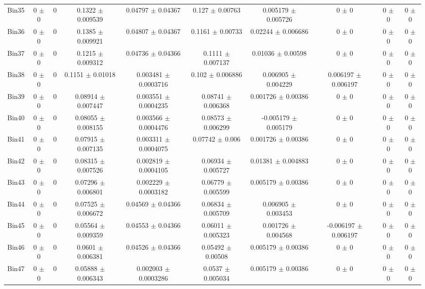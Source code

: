 \begin{tabular}{@{\extracolsep{4pt}}lccccccccc@{}}
     Bin35 & 0 $\pm$ 0 & 0 & 0.1322 $\pm$ 0.009539 & 0.04797 $\pm$ 0.04367 & 0.127 $\pm$ 0.00763 & 0.005179 $\pm$ 0.005726 & 0 $\pm$ 0 & 0 $\pm$ 0 & 0 $\pm$ 0 \\ 
     Bin36 & 0 $\pm$ 0 & 0 & 0.1385 $\pm$ 0.009921 & 0.04807 $\pm$ 0.04367 & 0.1161 $\pm$ 0.00733 & 0.02244 $\pm$ 0.006686 & 0 $\pm$ 0 & 0 $\pm$ 0 & 0 $\pm$ 0 \\ 
     Bin37 & 0 $\pm$ 0 & 0 & 0.1215 $\pm$ 0.009312 & 0.04736 $\pm$ 0.04366 & 0.1111 $\pm$ 0.007137 & 0.01036 $\pm$ 0.00598 & 0 $\pm$ 0 & 0 $\pm$ 0 & 0 $\pm$ 0 \\ 
     Bin38 & 0 $\pm$ 0 & 0 & 0.1151 $\pm$ 0.01018 & 0.003481 $\pm$ 0.0003716 & 0.102 $\pm$ 0.006886 & 0.006905 $\pm$ 0.004229 & 0.006197 $\pm$ 0.006197 & 0 $\pm$ 0 & 0 $\pm$ 0 \\ 
     Bin39 & 0 $\pm$ 0 & 0 & 0.08914 $\pm$ 0.007447 & 0.003551 $\pm$ 0.0004235 & 0.08741 $\pm$ 0.006368 & 0.001726 $\pm$ 0.00386 & 0 $\pm$ 0 & 0 $\pm$ 0 & 0 $\pm$ 0 \\ 
     Bin40 & 0 $\pm$ 0 & 0 & 0.08055 $\pm$ 0.008155 & 0.003566 $\pm$ 0.0004476 & 0.08573 $\pm$ 0.006299 & -0.005179 $\pm$ 0.005179 & 0 $\pm$ 0 & 0 $\pm$ 0 & 0 $\pm$ 0 \\ 
     Bin41 & 0 $\pm$ 0 & 0 & 0.07915 $\pm$ 0.007135 & 0.003311 $\pm$ 0.0004075 & 0.07742 $\pm$ 0.006 & 0.001726 $\pm$ 0.00386 & 0 $\pm$ 0 & 0 $\pm$ 0 & 0 $\pm$ 0 \\ 
     Bin42 & 0 $\pm$ 0 & 0 & 0.08315 $\pm$ 0.007526 & 0.002819 $\pm$ 0.0004105 & 0.06934 $\pm$ 0.005727 & 0.01381 $\pm$ 0.004883 & 0 $\pm$ 0 & 0 $\pm$ 0 & 0 $\pm$ 0 \\ 
     Bin43 & 0 $\pm$ 0 & 0 & 0.07296 $\pm$ 0.006801 & 0.002229 $\pm$ 0.0003182 & 0.06779 $\pm$ 0.005599 & 0.005179 $\pm$ 0.00386 & 0 $\pm$ 0 & 0 $\pm$ 0 & 0 $\pm$ 0 \\ 
     Bin44 & 0 $\pm$ 0 & 0 & 0.07525 $\pm$ 0.006672 & 0.04569 $\pm$ 0.04366 & 0.06834 $\pm$ 0.005709 & 0.006905 $\pm$ 0.003453 & 0 $\pm$ 0 & 0 $\pm$ 0 & 0 $\pm$ 0 \\ 
     Bin45 & 0 $\pm$ 0 & 0 & 0.05564 $\pm$ 0.009359 & 0.04553 $\pm$ 0.04366 & 0.06011 $\pm$ 0.005323 & 0.001726 $\pm$ 0.004568 & -0.006197 $\pm$ 0.006197 & 0 $\pm$ 0 & 0 $\pm$ 0 \\ 
     Bin46 & 0 $\pm$ 0 & 0 & 0.0601 $\pm$ 0.006381 & 0.04526 $\pm$ 0.04366 & 0.05492 $\pm$ 0.00508 & 0.005179 $\pm$ 0.00386 & 0 $\pm$ 0 & 0 $\pm$ 0 & 0 $\pm$ 0 \\ 
     Bin47 & 0 $\pm$ 0 & 0 & 0.05888 $\pm$ 0.006343 & 0.002003 $\pm$ 0.0003286 & 0.0537 $\pm$ 0.005034 & 0.005179 $\pm$ 0.00386 & 0 $\pm$ 0 & 0 $\pm$ 0 & 0 $\pm$ 0 \\ 

\end{tabular}

